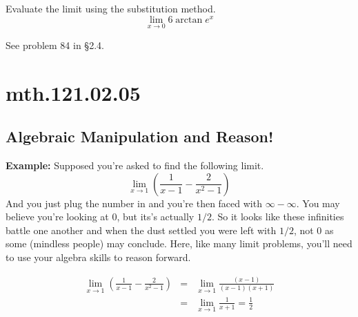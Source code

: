 \documentclass[12pt,addpoints, answers, fleqn]{exam}
\begin{document}
\begin{teacher}
\begin{questions}
\begin{solution}
\end{solution}


\question 	%

Evaluate the limit using the substitution method.
\[
\lim_{x \to 0} 6 \arctan e^x
\]

\begin{solution}
\end{solution}

\question 	%

See problem 84 in \S2.4.

\begin{solution}
\end{solution}

\end{questions}
\end{teacher}

\vfill
\pagebreak

\section{mth.121.02.05}
\subsection{Algebraic Manipulation and Reason!}


\textbf{Example:} Supposed you're asked to find the following limit.
\[
\lim_{x \to 1} \left( \frac{1}{x-1} - \frac{2}{x^2-1} \right)
\]
And you just plug the number in and you're then faced with $\infty - \infty$. You may believe you're looking at $0$, but its's actually $1/2$. So it looks like these infinities battle one another and when the dust settled you were left with $1/2$, not $0$ as some (mindless people) may conclude. Here, like many limit problems, you'll need to use your algebra skills to reason forward.



\begin{solution}

\begin{eqnarray*}
\lim_{x \to 1} \left( \frac{1}{x-1} - \frac{2}{x^2-1} \right) &=& \lim_{x \to 1} \frac{\left( x -1 \right)}{\left( x -1 \right)\left( x +1 \right)}\\
&=&  \lim_{x \to 1} \frac{1}{ x +1} = \frac{1}{2}
\end{eqnarray*}
\end{solution}
\end{document}
